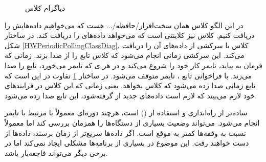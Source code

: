 \begin{figure}[h!]
\centering
{}
\caption{دیاگرام کلاس }
\label{HWOpportunisticPollingClassDiag}
\end{figure}
\begin{RTL}
در این الگو کلاس  همان سخت‌افزار/حافظه/... هست که
می‌خواهیم داده‌هایش را دریافت کنیم. کلاس  نیز
کلاینتی است که می‌خواهد داده‌های  را دریافت کند.
در ساختار شکل \ref{HWPeriodicPollingClassDiag}، کلاس
 با سرکشی از  داده‌های
آن را دریافت می‌کند. این سرکشی زمانی انجام می‌شود که کلاس 
تابع  را از  صدا بزند.
زمانی که فرمان  به بیاید، تایمر کار خود را شروع
می‌کند و در هر ی که تایمر می‌خورد، تابع  را
صدا می‌زند. با فراخوانی تابع ، تایمر متوقف می‌شود.
در ساختار \ref{HWOpportunisticPollingClassDiag} تفاوت
در این است که تابع  زمانی صدا زده می‌شود که کلاس
 بخواهد. یعنی زمانی که این
کلاس در فرایندهای خود لازم می‌بیند که لازم است داده‌های جدید از 
گرفته‌شود، این تابع صدا زده می‌شود.
\end{RTL}
\begin{RTL}
 ساده‌تر از راه‌اندازی و استفاده از
 () است، هرچند 
دوره‌ای معمولاً با  مرتبط با تایمر  انجام می‌شود.
 می‌تواند وضعیت بسیاری از دستگاه‌ها را همزمان بررسی کند
اما معمولاً نسبت به وقفه‌ها کمتر به موقع است. اگر داده‌ها سریع‌تر از
زمان  برسند، داده‌ها از دست خواهند رفت.
این موضوع در بسیاری از برنامه‌ها مشکلی ایجاد نمی‌کند اما در برخی دیگر
می‌تواند فاجعه‌بار باشد.
\end{RTL}